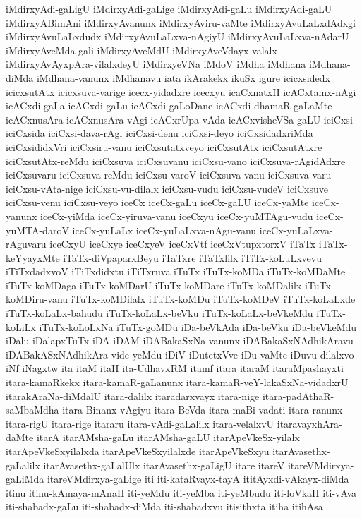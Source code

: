 {iMdirxyAdi-gaLigU
iMdirxyAdi-gaLige
iMdirxyAdi-gaLu
iMdirxyAdi-gaLU
iMdirxyABimAni
iMdirxyAvanunx
iMdirxyAviru-vaMte
iMdirxyAvuLaLxdAdxgi
iMdirxyAvuLaLxdudx
iMdirxyAvuLaLxva-nAgiyU
iMdirxyAvuLaLxva-nAdarU
iMdirxyAveMda-gali
iMdirxyAveMdU
iMdirxyAveVdayx-valalx
iMdirxyAvAyxpAra-vilalxdeyU
iMdirxyeVNa
iMdoV
iMdha
iMdhana
iMdhana-diMda
iMdhana-vanunx
iMdhanavu
iata
ikArakekx
ikuSx
igure
icicxsidedx
icicxsutAtx
icicxsuva-varige
icecx-yidadxre
icecxyu
icaCxnatxH
icACxtamx-nAgi
icACxdi-gaLa
icACxdi-gaLu
icACxdi-gaLoDane
icACxdi-dhamaR-gaLaMte
icACxnusAra
icACxnusAra-vAgi
icACxrUpa-vAda
icACxvisheVSa-gaLU
iciCxsi
iciCxsida
iciCxsi-dava-rAgi
iciCxsi-denu
iciCxsi-deyo
iciCxsidadxriMda
iciCxsididxVri
iciCxsiru-vanu
iciCxsutatxveyo
iciCxsutAtx
iciCxsutAtxre
iciCxsutAtx-reMdu
iciCxsuva
iciCxsuvanu
iciCxsu-vano
iciCxsuva-rAgidAdxre
iciCxsuvaru
iciCxsuva-reMdu
iciCxsu-varoV
iciCxsuva-vanu
iciCxsuva-varu
iciCxsu-vAta-nige
iciCxsu-vu-dilalx
iciCxsu-vudu
iciCxsu-vudeV
iciCxsuve
iciCxsu-venu
iciCxsu-veyo
iceCx
iceCx-gaLu
iceCx-gaLU
iceCx-yaMte
iceCx-yanunx
iceCx-yiMda
iceCx-yiruva-vanu
iceCxyu
iceCx-yuMTAgu-vudu
iceCx-yuMTA-daroV
iceCx-yuLaLx
iceCx-yuLaLxva-nAgu-vanu
iceCx-yuLaLxva-rAguvaru
iceCxyU
iceCxye
iceCxyeV
iceCxVtf
iceCxVtupxtorxV
iTaTx
iTaTx-keYyayxMte
iTaTx-diVpaparxBeyu
iTaTxre
iTaTxlilx
iTiTx-koLuLxvevu
iTiTxdadxvoV
iTiTxdidxtu
iTiTxruva
iTuTx
iTuTx-koMDa
iTuTx-koMDaMte
iTuTx-koMDaga
iTuTx-koMDarU
iTuTx-koMDare
iTuTx-koMDalilx
iTuTx-koMDiru-vanu
iTuTx-koMDilalx
iTuTx-koMDu
iTuTx-koMDeV
iTuTx-koLaLxde
iTuTx-koLaLx-bahudu
iTuTx-koLaLx-beVku
iTuTx-koLaLx-beVkeMdu
iTuTx-koLiLx
iTuTx-koLoLxNa
iTuTx-goMDu
iDa-beVkAda
iDa-beVku
iDa-beVkeMdu
iDalu
iDalapxTuTx
iDA
iDAM
iDABakaSxNa-vanunx
iDABakaSxNAdhikAravu
iDABakASxNAdhikAra-vide-yeMdu
iDiV
iDutetxVve
iDu-vaMte
iDuvu-dilalxvo
iNf
iNagxtw
ita
itaM
itaH
ita-UdhavxRM
itamf
itara
itaraM
itaraMpashayxti
itara-kamaRkekx
itara-kamaR-gaLanunx
itara-kamaR-veY-lakaSxNa-vidadxrU
itarakAraNa-diMdalU
itara-dalilx
itaradarxvayx
itara-nige
itara-padAthaR-saMbaMdha
itara-Binanx-vAgiyu
itara-BeVda
itara-maBi-vadati
itara-ranunx
itara-rigU
itara-rige
itararu
itara-vAdi-gaLalilx
itara-velalxvU
itaravayxhAra-daMte
itarA
itarAMsha-gaLu
itarAMsha-gaLU
itarApeVkeSx-yilalx
itarApeVkeSxyilalxda
itarApeVkeSxyilalxde
itarApeVkeSxyu
itarAvasethx-gaLalilx
itarAvasethx-gaLalUlx
itarAvasethx-gaLigU
itare
itareV
itareVMdirxya-gaLiMda
itareVMdirxya-gaLige
iti
iti-kataRvayx-tayA
ititAyxdi-vAkayx-diMda
itinu
itinu-kAmaya-mAnaH
iti-yeMdu
iti-yeMba
iti-yeMbudu
iti-loVkaH
iti-vAva
iti-shabadx-gaLu
iti-shabadx-diMda
iti-shabadxvu
itisithxta
itiha
itihAsa
}
